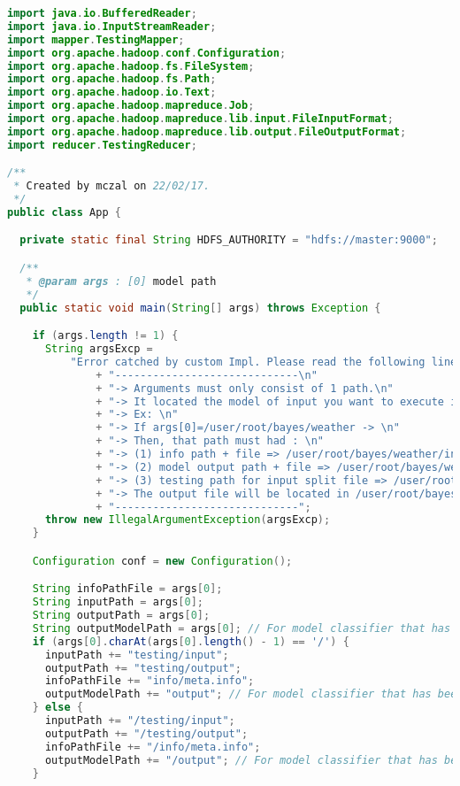 \begin{lstlisting}[language=Java,basicstyle=\tiny,caption=App.java]
import java.io.BufferedReader;
import java.io.InputStreamReader;
import mapper.TestingMapper;
import org.apache.hadoop.conf.Configuration;
import org.apache.hadoop.fs.FileSystem;
import org.apache.hadoop.fs.Path;
import org.apache.hadoop.io.Text;
import org.apache.hadoop.mapreduce.Job;
import org.apache.hadoop.mapreduce.lib.input.FileInputFormat;
import org.apache.hadoop.mapreduce.lib.output.FileOutputFormat;
import reducer.TestingReducer;

/**
 * Created by mczal on 22/02/17.
 */
public class App {

  private static final String HDFS_AUTHORITY = "hdfs://master:9000";

  /**
   * @param args : [0] model path
   */
  public static void main(String[] args) throws Exception {

    if (args.length != 1) {
      String argsExcp =
          "Error catched by custom Impl. Please read the following line below.\n"
              + "-----------------------------\n"
              + "-> Arguments must only consist of 1 path.\n"
              + "-> It located the model of input you want to execute in HDFS.\n"
              + "-> Ex: \n"
              + "-> If args[0]=/user/root/bayes/weather -> \n"
              + "-> Then, that path must had : \n"
              + "-> (1) info path + file => /user/root/bayes/weather/info/meta.info\n"
              + "-> (2) model output path + file => /user/root/bayes/weather/output/...\n"
              + "-> (3) testing path for input split file => /user/root/bayes/weather/testing/input/...\n"
              + "-> The output file will be located in /user/root/bayes/weather/output/...\n"
              + "-----------------------------";
      throw new IllegalArgumentException(argsExcp);
    }

    Configuration conf = new Configuration();

    String infoPathFile = args[0];
    String inputPath = args[0];
    String outputPath = args[0];
    String outputModelPath = args[0]; // For model classifier that has been generated with different module program
    if (args[0].charAt(args[0].length() - 1) == '/') {
      inputPath += "testing/input";
      outputPath += "testing/output";
      infoPathFile += "info/meta.info";
      outputModelPath += "output"; // For model classifier that has been generated with different module program
    } else {
      inputPath += "/testing/input";
      outputPath += "/testing/output";
      infoPathFile += "/info/meta.info";
      outputModelPath += "/output"; // For model classifier that has been generated with different module program
    }


\end{lstlisting}

